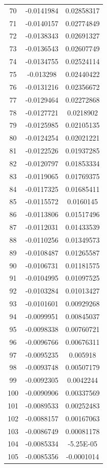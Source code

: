\documentclass[a4paper, 11pt, oneside]{report}
\begin{document}
{\begin{longtable}{|c|c|c|}
70  & -0.0141984 & 0.02858317 \\
71  & -0.0140157 & 0.02774849 \\
72  & -0.0138343 & 0.02691327 \\
73  & -0.0136543 & 0.02607749 \\
74  & -0.0134755 & 0.02524114 \\
75  & -0.013298  & 0.02440422 \\
76  & -0.0131216 & 0.02356672 \\
77  & -0.0129464 & 0.02272868 \\
78  & -0.0127721 & 0.0218902  \\
79  & -0.0125985 & 0.02105135 \\
80  & -0.0124254 & 0.02021221 \\
81  & -0.0122526 & 0.01937285 \\
82  & -0.0120797 & 0.01853334 \\
83  & -0.0119065 & 0.01769375 \\
84  & -0.0117325 & 0.01685411 \\
85  & -0.0115572 & 0.0160145  \\
86  & -0.0113806 & 0.01517496 \\
87  & -0.0112031 & 0.01433539 \\
88  & -0.0110256 & 0.01349573 \\
89  & -0.0108487 & 0.01265587 \\
90  & -0.0106731 & 0.01181575 \\
91  & -0.0104995 & 0.01097525 \\
92  & -0.0103284 & 0.01013427 \\
93  & -0.0101601 & 0.00929268 \\
94  & -0.0099951 & 0.00845037 \\
95  & -0.0098338 & 0.00760721 \\
96  & -0.0096766 & 0.00676311 \\
97  & -0.0095235 & 0.005918   \\
98  & -0.0093748 & 0.00507179 \\
99  & -0.0092305 & 0.0042244  \\
100 & -0.0090906 & 0.00337569 \\
101 & -0.0089533 & 0.00252483 \\
102 & -0.0088157 & 0.00167063 \\
103 & -0.0086749 & 0.00081178 \\
104 & -0.0085334 & -5.25E-05  \\
105 & -0.0085356 & -0.0001014 \\

\end{longtable}}
\end{document}
